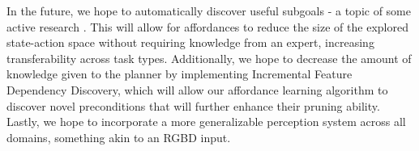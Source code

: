 \documentclass[conference]{IEEEtran}
\begin{document}
In the future, we hope to automatically discover useful subgoals - a topic of some active research \cite{Mcgovern01automaticdiscovery,Simsek:2005:IUS:1102351.1102454}. This will allow for affordances to reduce the size of the explored state-action space without requiring knowledge from an expert, increasing transferability across task types. Additionally, we hope to decrease the amount of knowledge given to the planner by implementing Incremental Feature Dependency Discovery, which will allow our affordance learning algorithm to discover novel preconditions that will further enhance their pruning ability. Lastly, we hope to incorporate a more generalizable perception system across all domains, something akin to an RGBD input.


{\small


}
\end{document}

